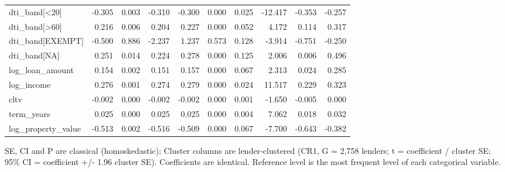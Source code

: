 \begin{table}[t]
{\begin{tabular}{lrrrrrrrrr}
dti\_band[<20] & -0.305 & 0.003 & -0.310 & -0.300 & 0.000 & 0.025 & -12.417 & -0.353 & -0.257 \\
dti\_band[>60] & 0.216 & 0.006 & 0.204 & 0.227 & 0.000 & 0.052 & 4.172 & 0.114 & 0.317 \\
dti\_band[EXEMPT] & -0.500 & 0.886 & -2.237 & 1.237 & 0.573 & 0.128 & -3.914 & -0.751 & -0.250 \\
dti\_band[NA] & 0.251 & 0.014 & 0.224 & 0.278 & 0.000 & 0.125 & 2.006 & 0.006 & 0.496 \\
log\_loan\_amount & 0.154 & 0.002 & 0.151 & 0.157 & 0.000 & 0.067 & 2.313 & 0.024 & 0.285 \\
log\_income & 0.276 & 0.001 & 0.274 & 0.279 & 0.000 & 0.024 & 11.517 & 0.229 & 0.323 \\
cltv & -0.002 & 0.000 & -0.002 & -0.002 & 0.000 & 0.001 & -1.650 & -0.005 & 0.000 \\
term\_years & 0.025 & 0.000 & 0.025 & 0.025 & 0.000 & 0.004 & 7.062 & 0.018 & 0.032 \\
log\_property\_value & -0.513 & 0.002 & -0.516 & -0.509 & 0.000 & 0.067 & -7.700 & -0.643 & -0.382 \\
\bottomrule
\end{tabular}}
\par\footnotesize SE, CI and P are classical (homoskedastic); Cluster columns are lender-clustered (CR1, G = 2,758 lenders; t = coefficient / cluster SE; 95\% CI = coefficient +/- 1.96 cluster SE). Coefficients are identical. Reference level is the most frequent level of each categorical variable.
\end{table}
